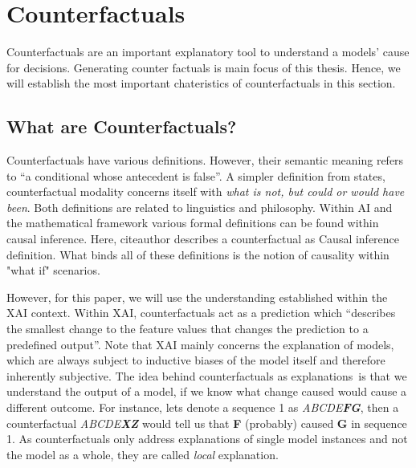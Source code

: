 \documentclass[12pt,a4paper]{report}
\begin{document}

  

\section{Counterfactuals}
\label{sec:counterfactuals}
Counterfactuals are an important explanatory tool to understand a models' cause for decisions. Generating counter factuals is main focus of this thesis. Hence, we will establish the most important chateristics of counterfactuals in this section.

\subsection{What are Counterfactuals?}
Counterfactuals have various definitions. However, their semantic meaning refers to \enquote{a conditional whose antecedent is false}\autocite{_Counterfactual_}. A simpler definition from \citeauthor{starr_Counterfactuals_2021} states, counterfactual modality concerns itself with \emph{what is not, but could or would have been}.
Both definitions are related to linguistics and philosophy. Within AI and the mathematical framework various formal definitions can be found within causal inference\autocite{hitchcock_CausalModels_2020}. Here, citeauthor describes a counterfactual as {Causal inference definition}. What binds all of these definitions is the notion of causality within "what if" scenarios. 

However, for this paper, we will use the understanding established within the \gls{XAI} context. Within \gls{XAI}, counterfactuals act as a prediction which \enquote{describes the smallest change to the feature values that changes the prediction to a predefined output}\autocite{molnar2019}. Note that \gls{XAI} mainly concerns the explanation of models, which are always subject to inductive biases of the model itself and therefore inherently subjective. The idea behind counterfactuals as explanations\footnotemark ~is that we understand the output of a model, if we know what change caused would cause a different outcome. For instance, lets denote a sequence 1 as \textit{ABCDE\textbf{FG}}, then a counterfactual \textit{ABCDE\textbf{XZ}} would tell us that \textbf{F} (probably) caused \textbf{G} in sequence 1. As counterfactuals only address explanations of single model instances and not the model as a whole, they are called \emph{local} explanation. 
\end{document}
